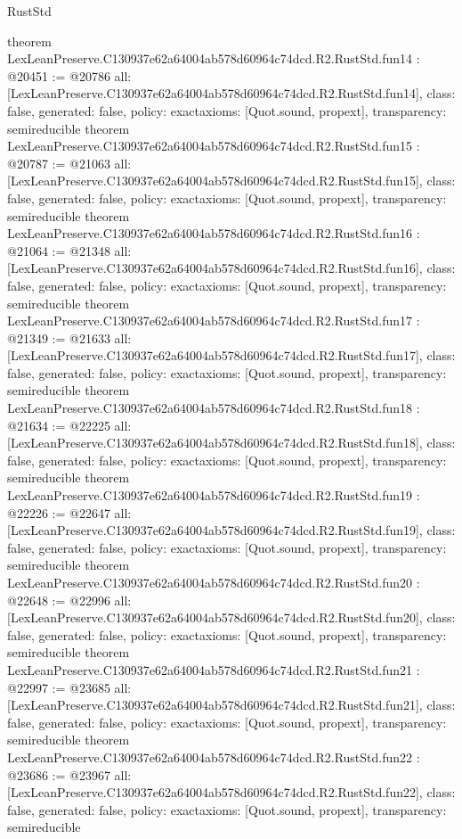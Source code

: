 \begin{lexlean}{RustStd}
\begin{coremodule}
{}
theorem LexLeanPreserve.C130937e62a64004ab578d60964c74dcd.R2.RustStd.fun14 : @20451 := @20786 {
  all: [LexLeanPreserve.C130937e62a64004ab578d60964c74dcd.R2.RustStd.fun14],
  class: false,
  generated: false,
  policy: exact{axioms: [Quot.sound, propext]},
  transparency: semireducible
}
theorem LexLeanPreserve.C130937e62a64004ab578d60964c74dcd.R2.RustStd.fun15 : @20787 := @21063 {
  all: [LexLeanPreserve.C130937e62a64004ab578d60964c74dcd.R2.RustStd.fun15],
  class: false,
  generated: false,
  policy: exact{axioms: [Quot.sound, propext]},
  transparency: semireducible
}
theorem LexLeanPreserve.C130937e62a64004ab578d60964c74dcd.R2.RustStd.fun16 : @21064 := @21348 {
  all: [LexLeanPreserve.C130937e62a64004ab578d60964c74dcd.R2.RustStd.fun16],
  class: false,
  generated: false,
  policy: exact{axioms: [Quot.sound, propext]},
  transparency: semireducible
}
theorem LexLeanPreserve.C130937e62a64004ab578d60964c74dcd.R2.RustStd.fun17 : @21349 := @21633 {
  all: [LexLeanPreserve.C130937e62a64004ab578d60964c74dcd.R2.RustStd.fun17],
  class: false,
  generated: false,
  policy: exact{axioms: [Quot.sound, propext]},
  transparency: semireducible
}
theorem LexLeanPreserve.C130937e62a64004ab578d60964c74dcd.R2.RustStd.fun18 : @21634 := @22225 {
  all: [LexLeanPreserve.C130937e62a64004ab578d60964c74dcd.R2.RustStd.fun18],
  class: false,
  generated: false,
  policy: exact{axioms: [Quot.sound, propext]},
  transparency: semireducible
}
theorem LexLeanPreserve.C130937e62a64004ab578d60964c74dcd.R2.RustStd.fun19 : @22226 := @22647 {
  all: [LexLeanPreserve.C130937e62a64004ab578d60964c74dcd.R2.RustStd.fun19],
  class: false,
  generated: false,
  policy: exact{axioms: [Quot.sound, propext]},
  transparency: semireducible
}
theorem LexLeanPreserve.C130937e62a64004ab578d60964c74dcd.R2.RustStd.fun20 : @22648 := @22996 {
  all: [LexLeanPreserve.C130937e62a64004ab578d60964c74dcd.R2.RustStd.fun20],
  class: false,
  generated: false,
  policy: exact{axioms: [Quot.sound, propext]},
  transparency: semireducible
}
theorem LexLeanPreserve.C130937e62a64004ab578d60964c74dcd.R2.RustStd.fun21 : @22997 := @23685 {
  all: [LexLeanPreserve.C130937e62a64004ab578d60964c74dcd.R2.RustStd.fun21],
  class: false,
  generated: false,
  policy: exact{axioms: [Quot.sound, propext]},
  transparency: semireducible
}
theorem LexLeanPreserve.C130937e62a64004ab578d60964c74dcd.R2.RustStd.fun22 : @23686 := @23967 {
  all: [LexLeanPreserve.C130937e62a64004ab578d60964c74dcd.R2.RustStd.fun22],
  class: false,
  generated: false,
  policy: exact{axioms: [Quot.sound, propext]},
  transparency: semireducible
}
\end{coremodule}
\end{lexlean}
